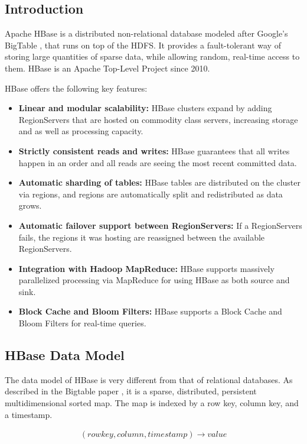 \subsection{Introduction}

Apache HBase \cite{hbase} is a distributed non-relational database modeled after Google's BigTable \cite{bigtable}, that runs on top of the HDFS. It provides a fault-tolerant way of storing large quantities of sparse data, while allowing random, real-time access to them. HBase is an Apache Top-Level Project since 2010.

HBase offers the following key features:
\begin{itemize}
\item \textbf{Linear and modular scalability:} HBase clusters expand by adding RegionServers that are hosted on commodity class servers, increasing storage and as well as processing capacity.
\item \textbf{Strictly consistent reads and writes:} HBase guarantees that all writes happen in an order and all reads are seeing the most recent committed data.
\item \textbf{Automatic sharding of tables:} HBase tables are distributed on the cluster via regions, and regions are automatically split and redistributed as data grows.
\item \textbf{Automatic failover support between RegionServers:} If a RegionServers fails, the regions it was hosting are reassigned between the available RegionServers.
\item \textbf{Integration with Hadoop MapReduce:} HBase supports massively parallelized processing via MapReduce for using HBase as both source and sink.
\item \textbf{Block Cache and Bloom Filters:} HBase supports a Block Cache and Bloom Filters for real-time queries.
\end{itemize}

\subsection{HBase Data Model}

The data model of HBase is very different from that of relational databases. As described in the Bigtable paper \cite{bigtable}, it is a sparse, distributed, persistent multidimensional sorted map. The map is indexed by a row key, column key, and a timestamp.

\begin{gather*}
(rowkey, column, timestamp) \rightarrow value
\end{gather*}

